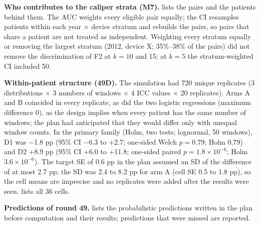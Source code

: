 \textbf{Who contributes to the caliper strata (M7).}  lists the pairs and the patients behind them. The AUC weights every eligible pair equally; the CI resamples patients within each year $\times$ device stratum and rebuilds the pairs, so pairs that share a patient are not treated as independent. Weighting every stratum equally or removing the largest stratum (2012, device X; 35\%--38\% of the pairs) did not remove the discrimination of F2 at $k=10$ and 15; at $k=5$ the stratum-weighted CI included 50.


\textbf{Within-patient structure (49D).} The simulation had 720 unique replicates (3 distributions $\times$ 3 numbers of windows $\times$ 4 ICC values $\times$ 20 replicates). Arms A and B coincided in every replicate, as did the two logistic regressions (maximum difference 0), as the design implies when every patient has the same number of windows; the plan had anticipated that they would differ only with unequal window counts. In the primary family (Holm, two tests; lognormal, 50 windows), D1 was $-$1.8 pp (95\% CI $-$6.3 to +2.7; one-sided Welch $p = 0.79$; Holm 0.79) and D2 +8.9 pp (95\% CI +6.0 to +11.8; one-sided paired $p = 1.8\times10^{-6}$; Holm $3.6\times10^{-6}$). The target SE of 0.6 pp in the plan assumed an SD of the difference of at most 2.7 pp; the SD was 2.4 to 8.2 pp for arm A (cell SE 0.5 to 1.8 pp), so the cell means are imprecise and no replicates were added after the results were seen.  lists all 36 cells.


\textbf{Predictions of round 49.}  lists the probabilistic predictions written in the plan before computation and their results; predictions that were missed are reported.

